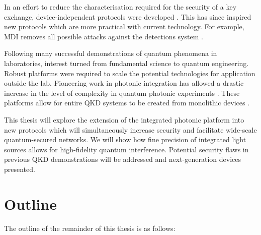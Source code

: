 In an effort to reduce the characterisation required for the security of a key exchange, device-independent protocols were developed \cite{Mayers1998}. This has since inspired new protocols which are more practical with current technology. For example, \ac{MDI} removes all possible attacks against the detections system \cite{mdi-qkd}. 

Following many successful demonstrations of quantum phenomena in laboratories, interest turned from fundamental science to quantum engineering. Robust platforms were required to scale the potential technologies for application outside the lab. Pioneering work in photonic integration has allowed a drastic increase in the level of complexity in quantum photonic experiments \cite{wang2019integrated}. These platforms allow for entire \ac{QKD} systems to be created from monolithic devices \cite{Sibson2017InP}.



This thesis will explore the extension of the integrated photonic platform into new protocols which will simultaneously increase security and facilitate wide-scale quantum-secured networks. We will show how fine precision of integrated light sources allows for high-fidelity quantum interference. Potential security flaws in previous \ac{QKD} demonstrations will be addressed and next-generation devices presented.


\clearpage
\newpage
\section{Outline}

The outline of the remainder of this thesis is as follows:

